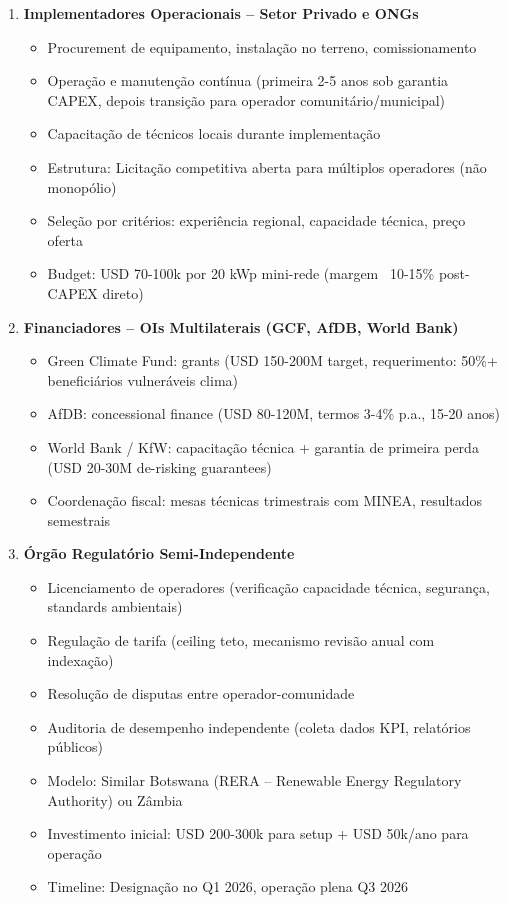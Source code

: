 \documentclass[12pt, a4paper]{article}
\begin{document}
{{{{{{{{{{{{{\begin{enumerate}
\item \textbf{Implementadores Operacionais -- Setor Privado e ONGs}
   \begin{itemize}
   \item Procurement de equipamento, instalação no terreno, comissionamento
   \item Operação e manutenção contínua (primeira 2-5 anos sob garantia CAPEX, depois transição para operador comunitário/municipal)
   \item Capacitação de técnicos locais durante implementação
   \item Estrutura: Licitação competitiva aberta para múltiplos operadores (não monopólio)
   \item Seleção por critérios: experiência regional, capacidade técnica, preço oferta
   \item Budget: USD 70-100k por 20 kWp mini-rede (margem ~10-15\% post-CAPEX direto)
   \end{itemize}

\item \textbf{Financiadores -- OIs Multilaterais (GCF, AfDB, World Bank)}
   \begin{itemize}
   \item Green Climate Fund: grants (USD 150-200M target, requerimento: 50\%+ beneficiários vulneráveis clima)
   \item AfDB: concessional finance (USD 80-120M, termos 3-4\% p.a., 15-20 anos)
   \item World Bank / KfW: capacitação técnica + garantia de primeira perda (USD 20-30M de-risking guarantees)
   \item Coordenação fiscal: mesas técnicas trimestrais com MINEA, resultados semestrais
   \end{itemize}

\item \textbf{Órgão Regulatório Semi-Independente}
   \begin{itemize}
   \item Licenciamento de operadores (verificação capacidade técnica, segurança, standards ambientais)
   \item Regulação de tarifa (ceiling teto, mecanismo revisão anual com indexação)
   \item Resolução de disputas entre operador-comunidade
   \item Auditoria de desempenho independente (coleta dados KPI, relatórios públicos)
   \item Modelo: Similar Botswana (RERA -- Renewable Energy Regulatory Authority) ou Zâmbia
   \item Investimento inicial: USD 200-300k para setup + USD 50k/ano para operação 
   \item Timeline: Designação no Q1 2026, operação plena Q3 2026
   \end{itemize}
\end{enumerate}

}}}}}}}}}}}}}
\end{document}
